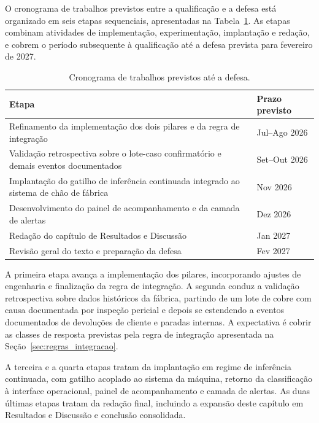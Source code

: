 O cronograma de trabalhos previstos entre a qualificação e a defesa está organizado em seis etapas sequenciais, apresentadas na Tabela~\ref{tab:cronograma}. As etapas combinam atividades de implementação, experimentação, implantação e redação, e cobrem o período subsequente à qualificação até a defesa prevista para fevereiro de 2027.

\begin{table}[htbp]
    \centering
    \footnotesize
    \caption{Cronograma de trabalhos previstos até a defesa.}
    \label{tab:cronograma}
    \begin{tabularx}{\textwidth}{Xl}
        \toprule
        \textbf{Etapa}                                                                                 & \textbf{Prazo previsto} \\
        \midrule
        Refinamento da implementação dos dois pilares e da regra de integração                          & Jul--Ago 2026 \\
        Validação retrospectiva sobre o lote-caso confirmatório e demais eventos documentados           & Set--Out 2026 \\
        Implantação do gatilho de inferência continuada integrado ao sistema de chão de fábrica         & Nov 2026 \\
        Desenvolvimento do painel de acompanhamento e da camada de alertas                              & Dez 2026 \\
        Redação do capítulo de Resultados e Discussão                                                   & Jan 2027 \\
        Revisão geral do texto e preparação da defesa                                                   & Fev 2027 \\
        \bottomrule
    \end{tabularx}
\end{table}

A primeira etapa avança a implementação dos pilares, incorporando ajustes de engenharia e finalização da regra de integração. A segunda conduz a validação retrospectiva sobre dados históricos da fábrica, partindo de um lote de cobre com causa documentada por inspeção pericial e depois se estendendo a eventos documentados de devoluções de cliente e paradas internas. A expectativa é cobrir as classes de resposta previstas pela regra de integração apresentada na Seção~\ref{sec:regras_integracao}.

A terceira e a quarta etapas tratam da implantação em regime de inferência continuada, com gatilho acoplado ao sistema da máquina, retorno da classificação à interface operacional, painel de acompanhamento e camada de alertas. As duas últimas etapas tratam da redação final, incluindo a expansão deste capítulo em Resultados e Discussão e conclusão consolidada.


